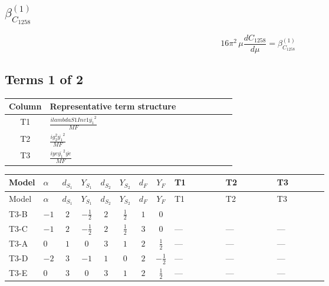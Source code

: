 \documentclass[8pt]{article}
\begin{document}
\begin{landscape}
\section*{$\beta_{C_{1258}}^{(1)}$}
\[16\pi^2\,\mu\frac{d C_{1258}}{d\mu}=\beta_{C_{1258}}^{(1)}\]
\subsection*{Terms 1 of 2}
\begin{center}
\begin{tabular}{@{}c >{\raggedright\arraybackslash}p{0.82\linewidth}@{}}
\toprule
Column & Representative term structure \\
\midrule
T1 & \(\displaystyle \frac{i lambdaS1Inv1 \overline{y_{1}}^{2}}{MF}\) \\
\midrule
T2 & \(\displaystyle \frac{i g_{2}^{2} \overline{y_{1}}^{2}}{MF}\) \\
\midrule
T3 & \(\displaystyle \frac{i ye \overline{y_{1}}^{2} \overline{ye}}{MF}\) \\
\midrule
\bottomrule
\end{tabular}
\end{center}
\smallskip
\tiny
\begin{longtable}{@{}llcccccc >{\raggedright\arraybackslash}p{0.21\linewidth} >{\raggedright\arraybackslash}p{0.21\linewidth} >{\raggedright\arraybackslash}p{0.21\linewidth}@{}}
\toprule
Model & $\alpha$ & $d_{S_1}$ & $Y_{S_1}$ & $d_{S_2}$ & $Y_{S_2}$ & $d_F$ & $Y_F$ & T1 & T2 & T3 \\
\midrule
\endfirsthead
\toprule
Model & $\alpha$ & $d_{S_1}$ & $Y_{S_1}$ & $d_{S_2}$ & $Y_{S_2}$ & $d_F$ & $Y_F$ & T1 & T2 & T3 \\
\midrule
\endhead
T3-B & $-1$ & $2$ & $-\frac{1}{2}$ & $2$ & $\frac{1}{2}$ & $1$ & $0$ & \scriptsize\adjustbox{max width=\linewidth}{$\begin{gathered} \frac{i lambdaS1Inv1 \overline{y_{1}}^{2}}{4 MF}\end{gathered}$} & \scriptsize\adjustbox{max width=\linewidth}{$\begin{gathered} \frac{3 i g_{2}^{2} \overline{y_{1}}^{2}}{8 MF}\end{gathered}$} & \scriptsize\adjustbox{max width=\linewidth}{$\begin{gathered} - \frac{i ye \overline{y_{1}}^{2} \overline{ye}}{8 MF}\end{gathered}$} \\
\midrule
T3-C & $-1$ & $2$ & $-\frac{1}{2}$ & $2$ & $\frac{1}{2}$ & $3$ & $0$ & --- & --- & --- \\
\midrule
T3-A & $0$ & $1$ & $0$ & $3$ & $1$ & $2$ & $\frac{1}{2}$ & --- & --- & --- \\
\midrule
T3-D & $-2$ & $3$ & $-1$ & $1$ & $0$ & $2$ & $-\frac{1}{2}$ & --- & --- & --- \\
\midrule
T3-E & $0$ & $3$ & $0$ & $3$ & $1$ & $2$ & $\frac{1}{2}$ & --- & --- & --- \\
\midrule
\bottomrule
\end{longtable}
\clearpage

\end{landscape}
\end{document}
